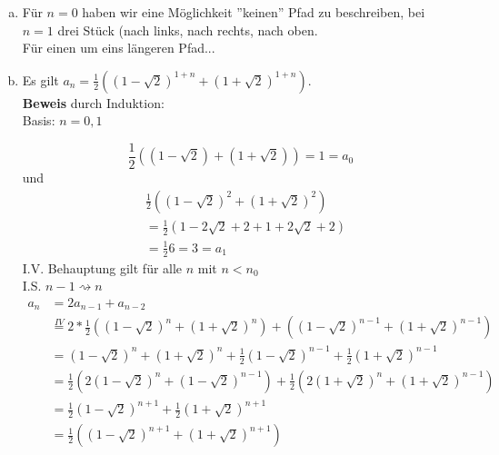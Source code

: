 \documentclass[11pt,a4paper,ngerman]{article}
\begin{document}
\begin{enumerate}[a)]
\item Für $n=0$ haben wir eine Möglichkeit ''keinen'' Pfad zu beschreiben, bei $n=1$ drei Stück (nach links, nach rechts, nach oben. \\
Für einen um eins längeren Pfad...

\item Es gilt $a_n = \frac{1}{2} \left( \left(1-\sqrt{2} \right)^{1+n}+\left(1+\sqrt{2}\right)^{1+n} \right)$. \\
\textbf{Beweis} durch Induktion: \\
Basis: $n = 0,1$

\begin{equation*}
\frac{1}{2} \left((1-\sqrt{2})+(1+\sqrt{2}) \right) = 1 = a_0
\end{equation*}
und
\begin{equation*}\begin{split}
& \frac{1}{2} \left((1-\sqrt{2})^2+(1+\sqrt{2})^2 \right) \\
& = \frac{1}{2} \left(1-2\sqrt{2}+2+1+2\sqrt{2}+2 \right) \\
& = \frac{1}{2} 6 = 3 = a_1
\end{split}\end{equation*}
I.V. Behauptung gilt für alle $n$ mit $n < n_0$ \\
I.S. $n-1 \rightsquigarrow n$ \\
\begin{equation*}\begin{split}
a_{n} &= 2a_{n-1} + a_{n-2} \\
      &\stackrel{IV}{=} 2* \frac{1}{2} \left( \left(1-\sqrt{2} \right)^{n}+\left(1+\sqrt{2}\right)^{n} \right)
        +   \left( \left(1-\sqrt{2} \right)^{n-1}+\left(1+\sqrt{2}\right)^{n-1} \right) \\
      &= \left(1-\sqrt{2} \right)^{n}+\left(1+\sqrt{2}\right)^{n} + \frac{1}{2}\left(1-\sqrt{2} \right)^{n-1}+\frac{1}{2}\left(1+\sqrt{2}\right)^{n-1} \\
      &= \frac{1}{2}\left(2 \left(1-\sqrt{2}\right)^{n} + \left(1-\sqrt{2}\right)^{n-1} \right)
          + \frac{1}{2}\left(2 \left(1+\sqrt{2}\right)^{n} + \left(1+\sqrt{2}\right)^{n-1} \right) \\
      &= \frac{1}{2} \left(1-\sqrt{2} \right)^{n+1}
         + \frac{1}{2} \left(1+\sqrt{2} \right)^{n+1} \\
      &= \frac{1}{2}\left(\left(1-\sqrt{2} \right)^{n+1} +\left(1+\sqrt{2} \right)^{n+1}  \right)
\end{split}\end{equation*}
\end{enumerate}
\end{document}
